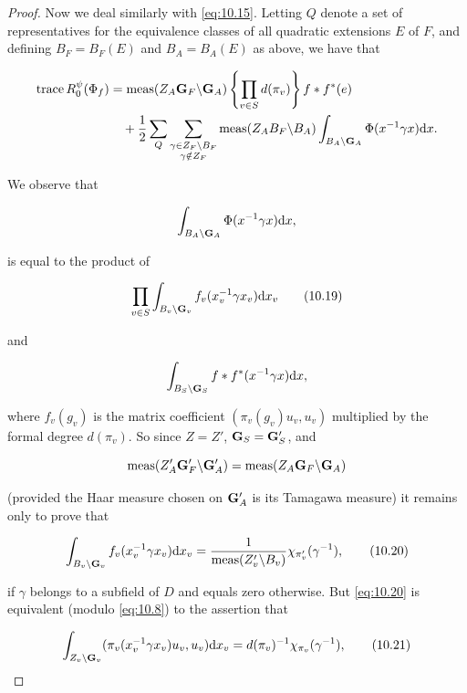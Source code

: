 \begin{proof}
Now we deal similarly with \eqref{eq:10.15}. Letting $Q$ denote a set of representatives for the equivalence classes of all quadratic extensions $E$ of $F$, and defining $B_F = B_F(E)$ and $B_A = B_A(E)$ as above, we have that

\[
\begin{aligned}
\operatorname{trace} R^{\psi}_0(\Phi_f) &= \operatorname{meas}(Z_A \mathbf{G}_F \backslash \mathbf{G}_A)\left\{\prod_{v \in S} d(\pi_v)\right\} f * f^*(e) \\
&\quad + \frac{1}{2}\sum_Q \sum_{\substack{\gamma \in Z_F \backslash B_F \\ \gamma \notin Z_F}} \operatorname{meas}(Z_A B_F \backslash B_A) \int_{B_A \backslash \mathbf{G}_A} \Phi(x^{-1}\gamma x) \mathrm{d} x.
\end{aligned}
\]

We observe that

\[
\int_{B_A \backslash \mathbf{G}_A} \Phi(x^{-1}\gamma x) \mathrm{d} x,
\]

is equal to the product of

\begin{equation}\label{eq:10.19}
\prod_{v \in S} \int_{B_v \backslash \mathbf{G}_v} f_v(x_v^{-1}\gamma x_v) \mathrm{d} x_v\tag{10.19}
\end{equation}

and

\[
\int_{B_S \backslash \mathbf{G}_S} f * f^*(x^{-1}\gamma x) \mathrm{d} x,
\]

where $f_v(g_v)$ is the matrix coefficient $(\pi_v(g_v)u_v, u_v)$ multiplied by the formal degree $d(\pi_v)$. So since $Z = Z'$, $\mathbf{G}_S = \mathbf{G}'_S$, and

\[
\operatorname{meas}(Z'_A \mathbf{G}'_F \backslash \mathbf{G}'_A) = \operatorname{meas}(Z_A \mathbf{G}_F \backslash \mathbf{G}_A)
\]

(provided the Haar measure chosen on $\mathbf{G}'_A$ is its Tamagawa measure) it remains only to prove that

\begin{equation}\label{eq:10.20}
\int_{B_v \backslash \mathbf{G}_v} f_v(x_v^{-1}\gamma x_v) \mathrm{d} x_v = \frac{1}{\operatorname{meas}(Z'_v \backslash B_v)}\chi_{\pi'_v}(\gamma^{-1}),\tag{10.20}
\end{equation}

if $\gamma$ belongs to a subfield of $D$ and equals zero otherwise. But \eqref{eq:10.20} is equivalent (modulo \eqref{eq:10.8}) to the assertion that

\begin{equation}\label{eq:10.21}
\int_{Z_v \backslash \mathbf{G}_v} (\pi_v(x_v^{-1}\gamma x_v)u_v, u_v) \mathrm{d} x_v = d(\pi_v)^{-1}\chi_{\pi_v}(\gamma^{-1}),\tag{10.21}
\end{equation}


\end{proof}
